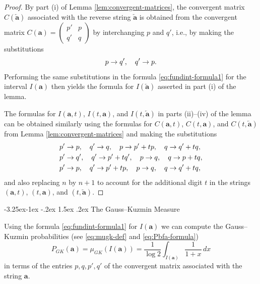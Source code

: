 \documentclass[10pt]{article}
\makeatletter
\renewcommand\subsection{\@startsection{subsection}{2}{\z@}
{-3.25ex\@plus -1ex \@minus -.2ex}
{1.5ex \@plus .2ex}
{\normalfont\normalsize\bfseries\boldmath}}
\theoremstyle{definition}
\numberwithin{equation}{section}
\numberwithin{lemma}{section}
\newcommand{\bfa}{\mathbf{a}}
\newcommand{\bfar}{\overleftarrow{\bfa}}
\makeatother
\begin{document}
\begin{proof}
By part (i) of Lemma \ref{lem:convergent-matrices}, the 
convergent matrix 
$C(\bfar)$
associated with the reverse string $\bfar$
is obtained from the convergent matrix 
$C(\bfa) =\left(\begin{smallmatrix} p'&p\\ q'&q\end{smallmatrix}\right)$
by interchanging $p$ and $q'$, i.e., by making the substitutions 
\begin{equation}
\notag
p\to q',\quad q'\to p.
\end{equation}
Performing the same substitutions in the formula 
\eqref{eq:fundint-formula1}
for the interval $I(\bfa)$ then yields
the formula for $I(\bfar)$ asserted in part (i) of the lemma.

The formulas for $I(\bfa,t)$, $I(t,\bfa)$, and $I(t,\bfar)$
in parts (ii)--(iv) of 
the lemma can be obtained similarly using the formulas for
$C(\bfa,t)$, $C(t,\bfa)$, and $C(t,\bfar)$  from Lemma 
\ref{lem:convergent-matrices} and making the substitutions 
\begin{align}
\notag
&p'\to p,\quad q'\to q,\quad p\to p'+tp,\quad q\to q'+tq,
\\
\notag
&p'\to q',\quad q'\to p'+tq',\quad p\to q,\quad q\to p+tq,
\\
\notag
&p'\to p,\quad q'\to p'+tp,\quad p\to q,\quad q\to q'+tq,
\end{align}
and also replacing $n$ by $n+1$ to account for the additional digit $t$ in
the strings $(\bfa,t)$, $(t,\bfa)$, and $(t,\bfar)$. 
\end{proof}



\subsection{The Gauss--Kuzmin Measure}

Using the formula \eqref{eq:fundint-formula1}
for $I(\bfa)$ 
we can compute 
the Gauss--Kuzmin probabilities 
(see \eqref{eq:mugk-def} and \eqref{eq:Pbfa-formula})
\begin{equation}
P_{GK}(\bfa)=\mu_{GK}(I(\bfa))=\frac1{\log 2}\int_{I(\bfa)}
\frac1{1+x}\, dx
\end{equation}
in terms of the entries $p,q,p',q'$ of the convergent matrix associated
with the string $\bfa$.
\end{document}
